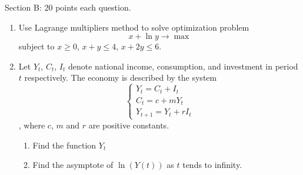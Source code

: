 \documentclass[pdftex,12pt,a4paper]{article}
\begin{document}
Section B: 20 points each question.
\begin{enumerate}

\item Use Lagrange multipliers method to solve optimization problem 
\[x+\ln y\to \max\]  
subject to 
$x\geq 0$, $x+y\leq 4$, $x+2y\leq 6$.

\item Let $Y_t$, $C_t$, $I_t$ denote national income, consumption, and investment in period $t$ respectively. The economy is described by the system
\begin{equation}
\left\{
\begin{array}{l}
Y_t=C_t+I_t\\
C_t=c+mY_t\\
Y_{t+1}=Y_{t}+rI_t
\end{array} 
\right.
\end{equation},
where $c$, $m$ and $r$ are positive constants.
\begin{enumerate}
\item Find the function $Y_t$
\item Find the asymptote of $\ln(Y(t))$ as $t$ tends to infinity.
\end{enumerate}


\end{enumerate}
\end{document}
